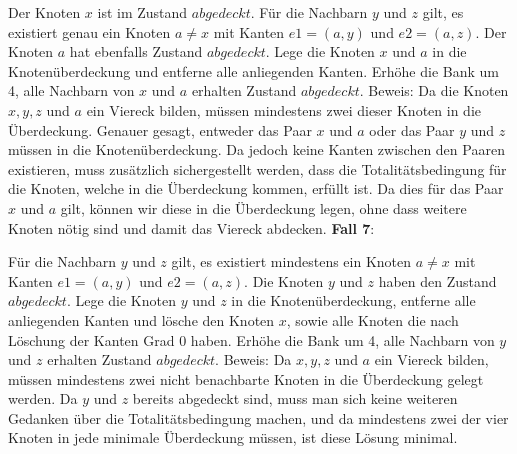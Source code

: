 \documentclass[12pt,onecolumn, notitlepage]{scrartcl}
\begin{document}
Der Knoten $x$ ist im Zustand $abgedeckt$.  Für die Nachbarn $y$ und $z$ gilt, es existiert genau ein Knoten $a \neq x$ mit Kanten $e1 = (a,y)$ und $e2 = (a,z)$. Der Knoten $a$ hat ebenfalls Zustand $abgedeckt$.  Lege die Knoten $x$ und $a$ in die Knotenüberdeckung und entferne alle anliegenden Kanten. Erhöhe die Bank um 4, alle Nachbarn von $x$ und $a$ erhalten Zustand $abgedeckt$. \newline
Beweis: Da die Knoten $x,y,z$ und $a$ ein Viereck bilden, müssen mindestens zwei dieser Knoten in die Überdeckung. Genauer gesagt, entweder das Paar $x$ und $a$ oder das Paar $y$ und $z$ müssen in die Knotenüberdeckung. Da jedoch keine Kanten zwischen den Paaren existieren, muss zusätzlich sichergestellt werden, dass die Totalitätsbedingung für die Knoten, welche in die Überdeckung kommen, erfüllt ist. Da dies für das Paar $x$ und $a$ gilt, können wir diese in die Überdeckung legen, ohne dass weitere Knoten nötig sind und damit das Viereck abdecken. \newline \newpage
\textbf{Fall 7}:\newline
\begin{center}
\end{center}
Für die Nachbarn $y$ und $z$ gilt, es existiert mindestens ein Knoten $a \neq x$ mit Kanten $e1 = (a,y)$ und $e2 = (a,z)$. Die Knoten $y$ und $z$ haben den Zustand $abgedeckt$.  Lege die Knoten $y$ und $z$ in die Knotenüberdeckung, entferne alle anliegenden Kanten und lösche den Knoten $x$, sowie alle Knoten die nach Löschung der Kanten Grad $0$ haben. Erhöhe die Bank um 4, alle Nachbarn von $y$ und $z$ erhalten Zustand $abgedeckt$.  \newline 
Beweis: Da $x,y,z$ und $a$ ein Viereck bilden, müssen mindestens zwei nicht benachbarte Knoten in die Überdeckung gelegt werden. Da $y$ und $z$ bereits abgedeckt sind, muss man sich keine weiteren Gedanken über die Totalitätsbedingung machen, und da mindestens zwei der vier Knoten in jede minimale Überdeckung müssen, ist diese Lösung minimal. \newline\newline
\end{document}
